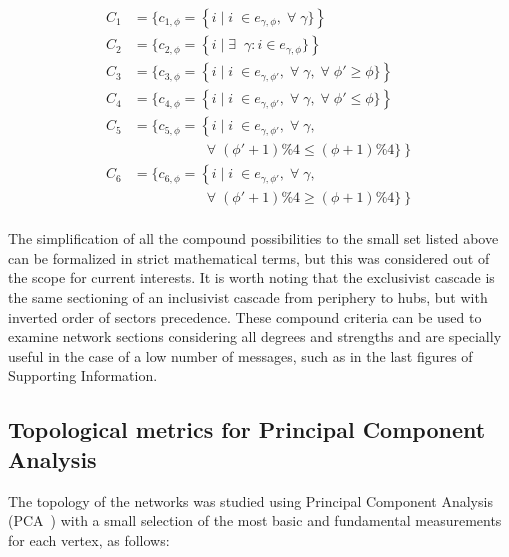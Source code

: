 \documentclass[%
	aip,
	jmp,%
	amsmath,amssymb,
	reprint,%
]{revtex4-1}
\begin{document}
\begin{equation}
	\begin{split}
		C_1&=\{c_{1,\phi}=\left\{i\mid i\;\in e_{\gamma,\phi}, \;\forall\; \gamma\}\right\} \\
		C_2&=\{c_{2,\phi}=\left\{i\mid \exists \;\;\gamma: i \in e_{\gamma,\phi}\}\right\} \\
		C_3&=\{c_{3,\phi}=\left\{i\mid i\;\in e_{\gamma,\phi'}, \;\forall\; \gamma,\;\forall\;\phi'\geq \phi\}\right\} \\
		C_4&=\{c_{4,\phi}=\left\{i\mid i\;\in e_{\gamma,\phi'}, \;\forall\; \gamma,\;\forall\;\phi'\leq \phi\}\right\} \\
		C_5&=\{c_{5,\phi}=\left\{i\mid i\;\in e_{\gamma,\phi'}, \;\forall\; \gamma,\right.\\
																																	&\;\;\;\;\;\;\;\;\;\;\;\;\;\;\;\;\;\; \left.\;\forall\;(\phi'+1)\%4\leq (\phi+1)\%4\}\right\} \\
		C_6&=\{c_{6,\phi}=\left\{i\mid i\;\in e_{\gamma,\phi'}, \;\forall\; \gamma,\right.\\
																																	&\;\;\;\;\;\;\;\;\;\;\;\;\;\;\;\;\;\; \left.\;\forall\;(\phi'+1)\%4\geq (\phi+1)\%4\}\right\} \\
	\end{split}
\end{equation}

The simplification of all the compound possibilities to the small set listed above can be formalized in strict mathematical terms, but this was considered out of the scope for current interests. It is worth noting that the exclusivist cascade is the same sectioning of an inclusivist cascade from periphery to hubs, but with inverted order of sectors precedence. These compound criteria can be used to examine network sections considering all degrees and strengths and are specially useful in the case of a low number of messages, such as in the last figures of Supporting Information.

\subsection{Topological metrics for Principal Component Analysis}\label{measures}

The topology of the networks was studied using Principal Component Analysis (PCA~\cite{pca}) with a small selection of the most basic and fundamental measurements for each vertex, as follows:
\end{document}
